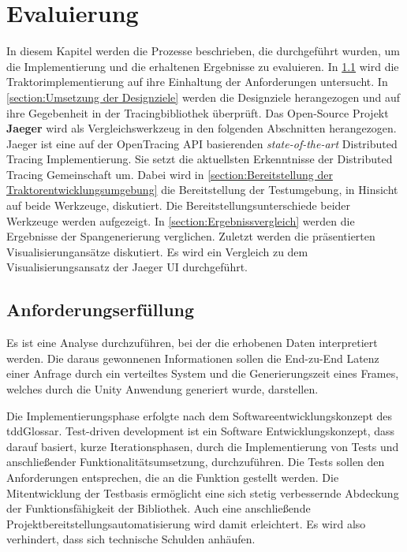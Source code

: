 %

\chapter{Evaluierung}
\label{chapter:Evaluierung}
In diesem Kapitel werden die Prozesse beschrieben, die durchgeführt wurden, um die Implementierung und die erhaltenen Ergebnisse zu evaluieren. In \cref{section:Anforderungserfüllung} wird die Traktorimplementierung auf ihre Einhaltung der Anforderungen  untersucht. In \cref{section:Umsetzung der Designziele} werden die Designziele herangezogen und auf ihre Gegebenheit in der Tracingbibliothek überprüft. Das Open-Source Projekt \textbf{Jaeger} wird als Vergleichswerkzeug in den folgenden Abschnitten herangezogen. Jaeger ist eine auf der OpenTracing API basierenden \emph{state-of-the-art} Distributed Tracing Implementierung. Sie setzt die aktuellsten Erkenntnisse der Distributed Tracing Gemeinschaft um. Dabei wird in \cref{section:Bereitstellung der Traktorentwicklungsumgebung} die Bereitstellung der Testumgebung, in Hinsicht auf beide Werkzeuge, diskutiert. Die Bereitstellungsunterschiede beider Werkzeuge werden aufgezeigt. In \cref{section:Ergebnissvergleich} werden die Ergebnisse der Spangenerierung verglichen. Zuletzt werden die präsentierten Visualisierungansätze diskutiert. Es wird ein Vergleich zu dem Visualisierungsansatz der Jaeger UI durchgeführt.

\section{Anforderungserfüllung}
\label{section:Anforderungserfüllung}

Es ist eine Analyse durchzuführen, bei der die erhobenen Daten interpretiert werden. Die daraus gewonnenen Informationen sollen die End-zu-End Latenz einer Anfrage durch ein verteiltes System und die Generierungszeit eines Frames, welches durch die Unity Anwendung generiert wurde, darstellen. 

Die Implementierungsphase erfolgte nach dem Softwareentwicklungskonzept des \gls{tddGlossar}. Test-driven development ist ein Software Entwicklungskonzept, dass darauf basiert, kurze Iterationsphasen, durch die Implementierung von Tests und anschließender Funktionalitätsumsetzung, durchzuführen. Die Tests sollen den Anforderungen entsprechen, die an die Funktion gestellt werden. Die Mitentwicklung der Testbasis ermöglicht eine sich stetig verbessernde Abdeckung der Funktionsfähigkeit der Bibliothek. Auch eine anschließende Projektbereitstellungsautomatisierung wird damit erleichtert. Es wird also verhindert, dass sich technische Schulden anhäufen.

